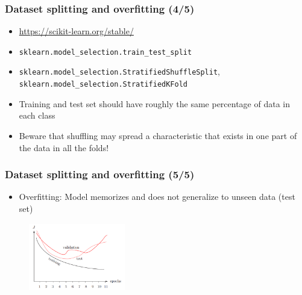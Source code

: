 \documentclass{beamer}
\begin{document}
\begin{frame}
\frametitle{Dataset splitting and overfitting (4/5)}

\begin{itemize}
\item \url{https://scikit-learn.org/stable/}
\item \texttt{sklearn.model\_selection.train\_test\_split}
\item \texttt{sklearn.model\_selection.StratifiedShuffleSplit}, \texttt{sklearn.model\_selection.StratifiedKFold}
\item Training and test set should have roughly the same percentage of data in each class
\item Beware that shuffling may spread a characteristic that exists in one part of the data in all the folds!
\end{itemize}
\end{frame}

\begin{frame}
\frametitle{Dataset splitting and overfitting (5/5)}

\begin{itemize}
\item Overfitting: Model memorizes and does not generalize to unseen data (test set)
\end{itemize}

\begin{figure}
  \includegraphics[width=4.2cm, height=3cm]{figures/NNError.png}
\end{figure}

\end{frame}

\end{document}
